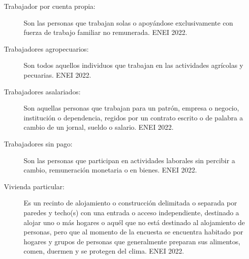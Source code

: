\begin{description}
	\item[Trabajador por cuenta propia:] Son las personas que trabajan solas o apoyándose exclusivamente con fuerza de trabajo familiar no remunerada. ENEI 2022.
	\item[Trabajadores agropecuarios:] Son todos aquellos individuos que trabajan en las actividades agrícolas y pecuarias. ENEI 2022.
	\item[Trabajadores asalariados:] Son aquellas personas que trabajan para un patrón, empresa o negocio, institución o dependencia, regidos por un contrato escrito o de palabra a cambio de un jornal, sueldo o salario. ENEI 2022.
	\item[Trabajadores sin pago:] Son las personas que participan en actividades laborales sin percibir a cambio, remuneración monetaria o en bienes. ENEI 2022.
	\item[Vivienda particular:] Es un recinto de alojamiento o construcción delimitada o separada por paredes y techo(s) con una entrada o acceso independiente, destinado a alojar uno o más hogares o aquél que no está destinado al alojamiento de personas, pero que al momento de la encuesta se encuentra habitado por hogares y grupos de personas que generalmente preparan sus alimentos, comen, duermen y se protegen del clima. ENEI 2022.
	

\end{description}
